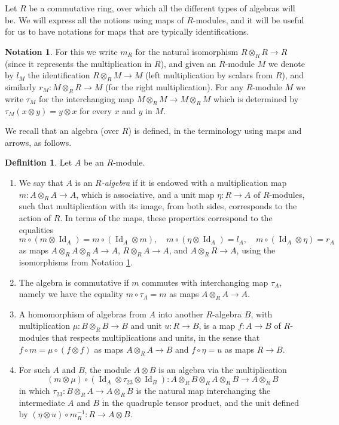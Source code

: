 \documentclass{article}
\theoremstyle{definition}
\newtheorem{defn}[thm]{Definition}
\newtheorem{notn}[thm]{Notation}
\begin{document}
Let $R$ be a commutative ring, over which all the different types of algebras will be. We will express all the notions using maps of $R$-modules, and it will be useful for us to have notations for maps that are typically identifications.
\begin{notn}
For this we write $m_{R}$ for the natural isomorphism $R\otimes_{R}R \to R$ (since it represents the multiplication in $R$), and given an $R$-module $M$ we denote by $l_{M}$ the identification $R\otimes_{R}M \to M$ (left multiplication by scalars from $R$), and similarly $r_{M}:M\otimes_{R}R \to M$ (for the right multiplication). For any $R$-module $M$ we write $\tau_{M}$ for the interchanging map $M\otimes_{R}M \to M\otimes_{R}M$ which is determined by $\tau_{M}(x \otimes y)=y \otimes x$ for every $x$ and $y$ in $M$. \label{notiso}
\end{notn}
We recall that an algebra (over $R$) is defined, in the terminology using maps and arrows, as follows.
\begin{defn}
Let $A$ be an $R$-module.
\begin{enumerate}[$(i)$]
\item We say that $A$ is an \emph{$R$-algebra} if it is endowed with a multiplication map $m:A\otimes_{R}A \to A$, which is associative, and a unit map $\eta:R \to A$ of $R$-modules, such that multiplication with its image, from both sides, corresponds to the action of $R$. In terms of the maps, these properties correspond to the equalities \[m\circ(m\otimes\operatorname{Id}_{A})=m\circ(\operatorname{Id}_{A} \otimes m),\quad m\circ(\eta\otimes\operatorname{Id}_{A})=l_{A},\quad m\circ(\operatorname{Id}_{A}\otimes\eta)=r_{A}\] as maps $A\otimes_{R}A\otimes_{R}A \to A$, $R\otimes_{R}A \to A$, and $A\otimes_{R}R \to A$, using the isomorphisms from Notation \ref{notiso}.
\item The algebra is commutative if $m$ commutes with interchanging map $\tau_{A}$, namely we have the equality $m\circ\tau_{A}=m$ as maps $A\otimes_{R}A \to A$.
\item A homomorphism of algebras from $A$ into another $R$-algebra $B$, with multiplication $\mu:B\otimes_{R}B \to B$ and unit $u:R \to B$, is a map $f:A \to B$ of $R$-modules that respects multiplications and units, in the sense that $f \circ m=\mu\circ(f \otimes f)$ as maps $A\otimes_{R}A \to B$ and $f\circ\eta=u$ as maps $R \to B$.
\item For such $A$ and $B$, the module $A \otimes B$ is an algebra via the multiplication \[(m\otimes\mu)\circ(\operatorname{Id}_{A}\otimes\tau_{23}\otimes\operatorname{Id}_{B}):A\otimes_{R}B\otimes_{R}A\otimes_{R}B \to A\otimes_{R}B\] in which $\tau_{23}:B\otimes_{R}A \to A\otimes_{R}B$ is the natural map interchanging the intermediate $A$ and $B$ in the quadruple tensor product, and the unit defined by $(\eta \otimes u) \circ m_{R}^{-1}:R \to A \otimes B$.
\end{enumerate} \label{alg}
\end{defn}
\end{document}
